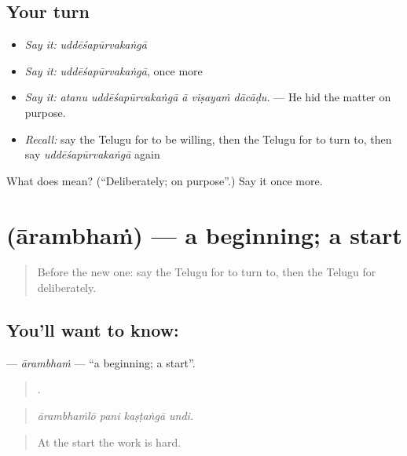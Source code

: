 \subsection*{Your turn}
\begin{itemize}
\raggedright
  \item \emph{Say it:} \emph{uddēśapūrvakaṅgā}
  \item \emph{Say it:} \emph{uddēśapūrvakaṅgā}, once more
  \item \emph{Say it:} \emph{atanu uddēśapūrvakaṅgā ā viṣayaṁ dācāḍu.} — He hid the matter on purpose.
  \item \emph{Recall:} say the Telugu for to be willing, then the Telugu for to turn to, then say \emph{uddēśapūrvakaṅgā} again
\end{itemize}

\begin{tcolorbox}[breakable,colback=teal!4,colframe=teal!35!black,title={Before you move on}]
What does  mean? (\textquotedblleft{}Deliberately; on purpose\textquotedblright{}.) Say it once more.
\end{tcolorbox}
\section[\texorpdfstring{\te{ఆరంభం} (ārambhaṁ)}{ఆరంభం (ārambhaṁ)}]{ (ārambhaṁ) — a beginning; a start}

\label{lesson:TE-C426-arambham}



\begin{quote}
Before the new one: say the Telugu for to turn to, then the Telugu for deliberately.
\end{quote}

\subsection*{You'll want to know: }
\textbf{} — \emph{ārambhaṁ} — \textquotedblleft{}a beginning; a start\textquotedblright{}.

\begin{quote}
   .
\end{quote}

\begin{quote}
\emph{ārambhaṁlō pani kaṣṭaṅgā undi.}
\end{quote}

\begin{quote}
At the start the work is hard.
\end{quote}


